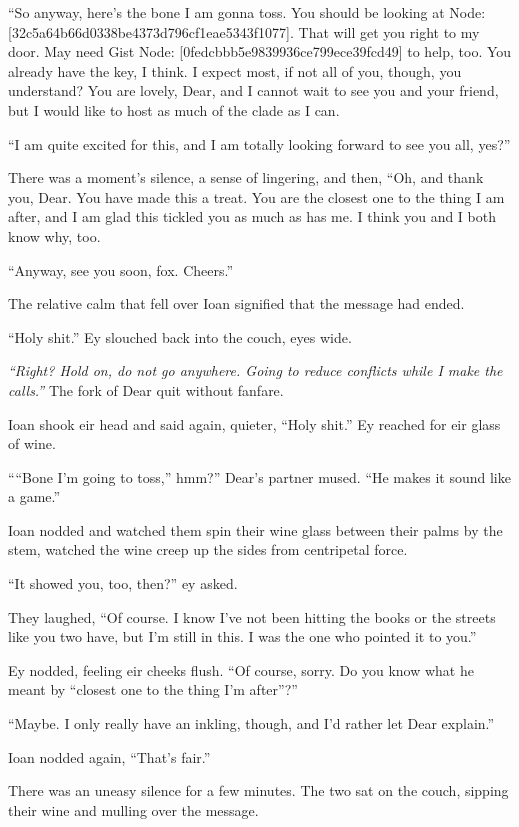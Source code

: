 ``So anyway, here's the bone I am gonna toss. You should be looking at Node: {[}32c5a64b66d0338be4373d796cf1eae5343f1077{]}. That will get you right to my door. May need Gist Node: {[}0fedcbbb5e9839936ce799ece39fcd49{]} to help, too. You already have the key, I think. I expect most, if not all of you, though, you understand? You are lovely, Dear, and I cannot wait to see you and your friend, but I would like to host as much of the clade as I can.

``I am quite excited for this, and I am totally looking forward to see you all, yes?''

There was a moment's silence, a sense of lingering, and then, ``Oh, and thank you, Dear. You have made this a treat. You are the closest one to the thing I am after, and I am glad this tickled you as much as has me. I think you and I both know why, too.

``Anyway, see you soon, fox. Cheers.''

The relative calm that fell over Ioan signified that the message had ended.

``Holy shit.'' Ey slouched back into the couch, eyes wide.

\emph{``Right? Hold on, do not go anywhere. Going to reduce conflicts while I make the calls.''} The fork of Dear quit without fanfare.

Ioan shook eir head and said again, quieter, ``Holy shit.'' Ey reached for eir glass of wine.

````Bone I'm going to toss,'' hmm?'' Dear's partner mused. ``He makes it sound like a game.''

Ioan nodded and watched them spin their wine glass between their palms by the stem, watched the wine creep up the sides from centripetal force.

``It showed you, too, then?'' ey asked.

They laughed, ``Of course. I know I've not been hitting the books or the streets like you two have, but I'm still in this. I was the one who pointed it to you.''

Ey nodded, feeling eir cheeks flush. ``Of course, sorry. Do you know what he meant by ``closest one to the thing I'm after''?''

``Maybe. I only really have an inkling, though, and I'd rather let Dear explain.''

Ioan nodded again, ``That's fair.''

There was an uneasy silence for a few minutes. The two sat on the couch, sipping their wine and mulling over the message.

